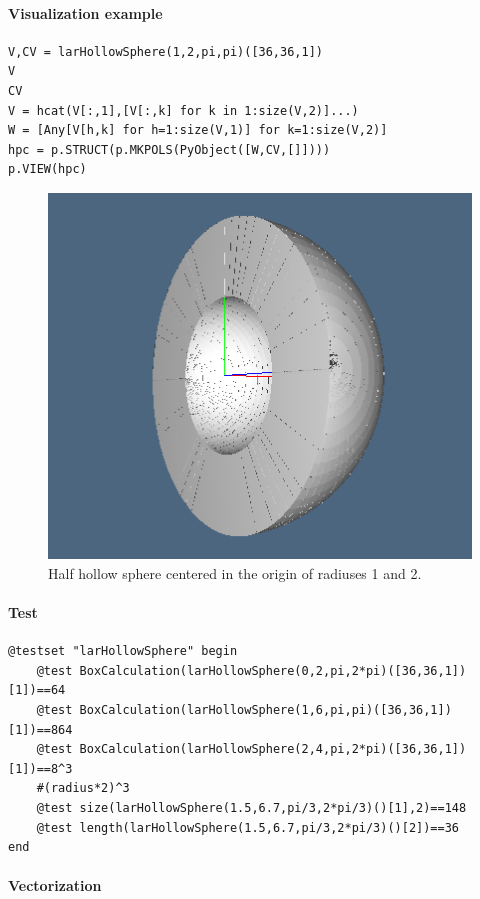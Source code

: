 \documentclass{article}
\begin{document}
\paragraph{Visualization example}

\begin{verbatim}
V,CV = larHollowSphere(1,2,pi,pi)([36,36,1])
V
CV
V = hcat(V[:,1],[V[:,k] for k in 1:size(V,2)]...)
W = [Any[V[h,k] for h=1:size(V,1)] for k=1:size(V,2)]
hpc = p.STRUCT(p.MKPOLS(PyObject([W,CV,[]])))
p.VIEW(hpc)
\end{verbatim}

\begin{figure}[htbp] 
\centering 
\includegraphics[scale=.38]{larHollowSphere.png} 
\caption{Half hollow sphere centered in the origin of radiuses 1 and 2.} 
\end{figure}

\paragraph{Test}

\begin{Verbatim}
@testset "larHollowSphere" begin
	@test BoxCalculation(larHollowSphere(0,2,pi,2*pi)([36,36,1])[1])==64
	@test BoxCalculation(larHollowSphere(1,6,pi,pi)([36,36,1])[1])==864
	@test BoxCalculation(larHollowSphere(2,4,pi,2*pi)([36,36,1])[1])==8^3
	#(radius*2)^3
	@test size(larHollowSphere(1.5,6.7,pi/3,2*pi/3)()[1],2)==148
	@test length(larHollowSphere(1.5,6.7,pi/3,2*pi/3)()[2])==36
end
\end{Verbatim}

\paragraph{Vectorization}
\end{document}
